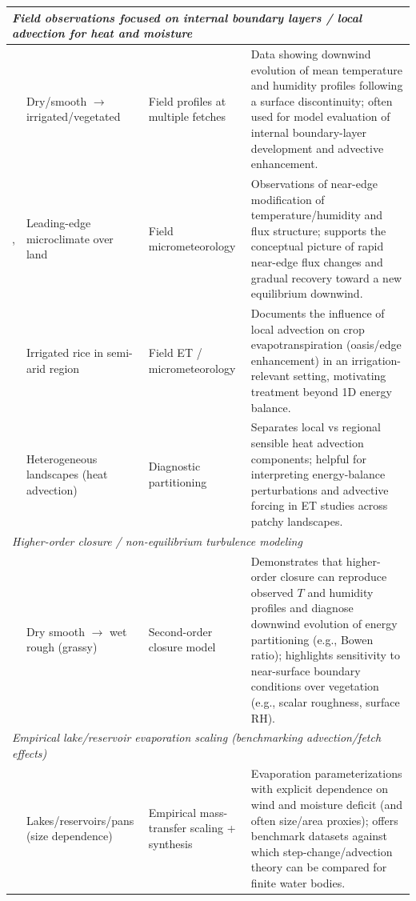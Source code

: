 \documentclass{article}
\begin{document}
\begin{table}[htbp]
\begin{tabular}{|p{2.7cm}|p{3.2cm}|p{2.9cm}|p{6.0cm}|}
    \multicolumn{4}{|l|}{\textit{Field observations focused on internal boundary layers / local advection for heat and moisture}} \\
    \hline
    \citet{rider1963horizontal}
    & Dry/smooth $\rightarrow$ irrigated/vegetated
    & Field profiles at multiple fetches
    & Data showing downwind evolution of mean temperature and humidity profiles following a surface discontinuity;
    often used for model evaluation of internal boundary-layer development and advective enhancement. \\
    \hline
    \citet{millar1964effect},
    & Leading-edge microclimate over land & Field micrometeorology & Observations of near-edge modification of temperature/humidity and flux structure; supports the conceptual picture of rapid near-edge flux changes and gradual recovery toward a new equilibrium downwind. \\
    \hline
    \citet{lang1974influence} & Irrigated rice in semi-arid region & Field ET / micrometeorology & Documents the influence of local advection on crop evapotranspiration (oasis/edge enhancement) in an irrigation-relevant setting, motivating treatment beyond 1D energy balance. \\
    \hline
    \citet{brakke1978local} & Heterogeneous landscapes (heat advection) & Diagnostic partitioning & Separates local vs regional sensible heat advection components; helpful for interpreting energy-balance perturbations and advective forcing in ET studies across patchy landscapes. \\
    \hline

    \multicolumn{4}{|l|}{\textit{Higher-order closure / non-equilibrium turbulence modeling}} \\
    \hline
    \citet{rao1974local} & Dry smooth $\rightarrow$ wet rough (grassy) & Second-order closure model & Demonstrates that higher-order closure can reproduce observed $T$ and humidity profiles and diagnose downwind evolution of energy partitioning (e.g., Bowen ratio); highlights sensitivity to near-surface boundary conditions over vegetation (e.g., scalar roughness, surface RH). \\
    \hline

    \multicolumn{4}{|l|}{\textit{Empirical lake/reservoir evaporation scaling (benchmarking advection/fetch effects)}} \\
    \hline
    \citet{ brutsaert1968mass} & Lakes/reservoirs/pans (size dependence) & Empirical mass-transfer scaling + synthesis & Evaporation parameterizations with explicit dependence on wind and moisture deficit (and often size/area proxies); offers benchmark datasets against which step-change/advection theory can be compared for finite water bodies. \\
    \hline
    \end{tabular}
    \end{table}
\end{document}
